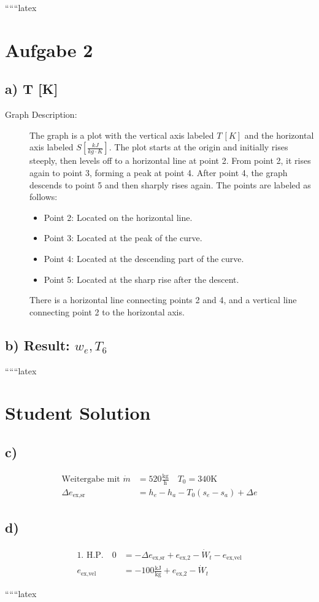 
``````latex


\section*{Aufgabe 2}

\subsection*{a) T [K]}
\begin{description}
    \item[Graph Description:] 
    The graph is a plot with the vertical axis labeled \( T \, [K] \) and the horizontal axis labeled \( S \left[ \frac{kJ}{kg \cdot K} \right] \). The plot starts at the origin and initially rises steeply, then levels off to a horizontal line at point 2. From point 2, it rises again to point 3, forming a peak at point 4. After point 4, the graph descends to point 5 and then sharply rises again. The points are labeled as follows:
    \begin{itemize}
        \item Point 2: Located on the horizontal line.
        \item Point 3: Located at the peak of the curve.
        \item Point 4: Located at the descending part of the curve.
        \item Point 5: Located at the sharp rise after the descent.
    \end{itemize}
    There is a horizontal line connecting points 2 and 4, and a vertical line connecting point 2 to the horizontal axis.
\end{description}

\subsection*{b) Result: \( w_e, T_6 \)}

``````latex


\section*{Student Solution}

\subsection*{c)}
\begin{align*}
\text{Weitergabe mit } \dot{m} &= 520 \frac{\text{kg}}{\text{h}} \quad T_0 = 340 \text{K} \\
\Delta e_{\text{ex,sr}} &= h_e - h_a - T_0 (s_e - s_a) + \Delta e
\end{align*}

\subsection*{d)}
\begin{align*}
\text{1. H.P.} \quad 0 &= -\Delta e_{\text{ex,sr}} + e_{\text{ex,2}} - \dot{W}_t - e_{\text{ex,vel}} \\
e_{\text{ex,vel}} &= -100 \frac{\text{kJ}}{\text{kg}} + e_{\text{ex,2}} - \dot{W}_t
\end{align*}

``````latex



